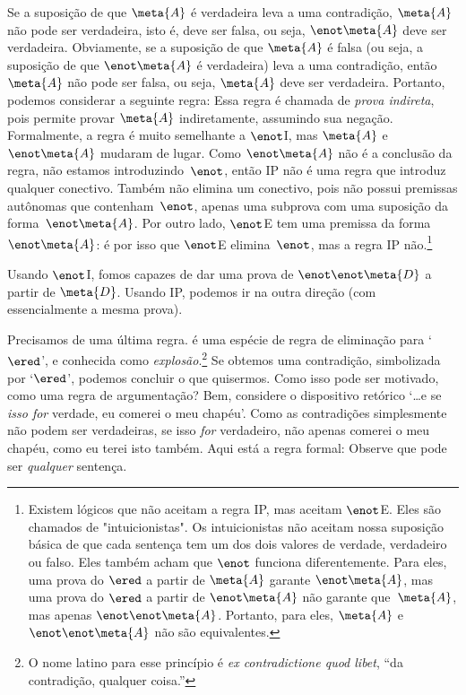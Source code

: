 Se a suposição de que $\meta{A}$ é verdadeira leva a uma contradição, $\meta{A}$ não pode ser verdadeira, isto é, deve ser falsa, ou seja, $\enot\meta{A}$ deve ser verdadeira. Obviamente, se a suposição de que $\meta{A}$ é falsa (ou seja, a suposição de que $\enot\meta{A}$ é verdadeira)  leva a uma contradição, então $\meta{A}$ não pode ser falsa, ou seja, $\meta{A}$ deve ser verdadeira. Portanto, podemos considerar a seguinte regra:
Essa regra é chamada de \emph{prova indireta}, pois permite provar $\meta{A}$  indiretamente, assumindo sua negação. Formalmente, a regra é muito semelhante a $\enot$I, mas $\meta{A}$ e $\enot\meta{A}$ mudaram de lugar. Como $\enot\meta{A}$ não é a conclusão da regra, não estamos introduzindo~$\enot$, então  IP não é uma regra que introduz qualquer conectivo. Também não elimina um conectivo, pois não possui premissas autônomas que contenham~$\enot$, apenas uma subprova com uma suposição da forma~$\enot\meta{A}$. Por outro lado, $\enot$E tem uma premissa da forma $\enot\meta{A}$: é por isso que $\enot$E elimina~$\enot$, mas a regra IP não.\footnote{Existem lógicos que não aceitam a regra IP, mas aceitam $\enot$E. Eles são chamados de "intuicionistas". Os intuicionistas não aceitam nossa suposição básica de que cada sentença tem um dos dois valores de verdade, verdadeiro ou falso. Eles também acham que $\enot$ funciona diferentemente. Para eles, uma prova do $\ered$ a partir de $\meta{A}$ garante $\enot \meta{A}$, mas uma prova do $\ered$ a partir de $\enot\meta{A}$ não garante que~$\meta{A}$, mas apenas $\enot\enot\meta{A}$. Portanto, para eles, $\meta{A}$ e $\enot\enot\meta{A}$ não são equivalentes.}


Usando $\enot$I, fomos capazes de dar uma prova de $\enot\enot\meta{D}$ a partir de $\meta{D}$. Usando IP, podemos ir na outra direção (com essencialmente a mesma prova).
	\begin{fitchproof}
		\open
		\close
	\end{fitchproof}

Precisamos de uma última regra. é uma espécie de regra de eliminação para `$\ered$', e conhecida como \emph{explosão}.\footnote{O nome latino para esse princípio é  \emph{ex contradictione quod libet}, ``da contradição, qualquer coisa.''}  Se obtemos uma contradição, simbolizada por `$\ered$', podemos concluir o que quisermos.  Como isso pode ser motivado, como uma regra de argumentação? Bem, considere o dispositivo retórico `\ldots e se \emph{isso for} verdade, eu comerei o meu chapéu'. Como as contradições simplesmente não podem ser verdadeiras, se isso \emph{for} verdadeiro, não apenas comerei o meu chapéu, como eu terei isto também. Aqui está a regra formal:
Observe que   pode ser \emph{qualquer} sentença.

